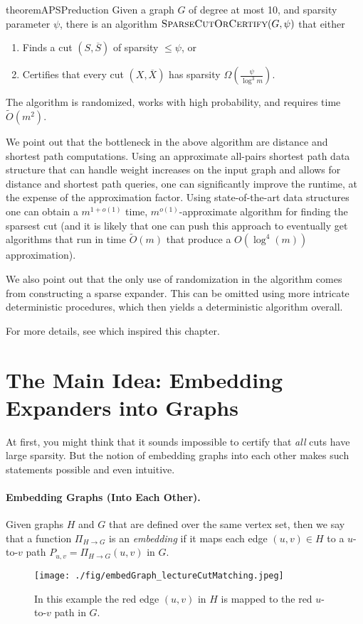 \begin{restatable}{theorem}{APSPreduction}\label{thm:fineGrainedReduction}
\label{theorem:balanceCut}
Given a graph $G$ of degree at most 10, and sparsity parameter $\psi$, there is an algorithm $\textsc{SparseCutOrCertify}(G, \psi)$ that either
\begin{enumerate}
    \item\label{case:balanceCut} Finds a cut $(S, \overline{S})$ of sparsity $\leq \psi$, or
    \item\label{case:noBalanceCut}
     Certifies that every cut $(X, \overline{X})$ has sparsity
  $\Omega\left(\frac{\psi}{ \log^3 m}\right).$
\end{enumerate}
The algorithm is randomized, works with high probability,  and requires time $\tilde{O}(m^2)$.
\end{restatable}

We point out that the bottleneck in the above algorithm are distance and shortest path computations. Using an approximate all-pairs shortest path data structure that can handle weight increases on the input graph and allows for distance and shortest path queries, one can significantly improve the runtime, at the expense of the approximation factor. Using state-of-the-art data structures \cite{chuzhoy2021decremental, bernstein2022deterministic} one can obtain a $m^{1+o(1)}$ time, $m^{o(1)}$-approximate algorithm for finding the sparsest cut (and it is likely that one can push this approach to eventually get algorithms that run in time $\tilde{O}(m)$ that produce a $O(\log^4(m))$ approximation).

We also point out that the only use of randomization in the algorithm comes from constructing a sparse expander. This can be omitted using more intricate deterministic procedures, which then yields a deterministic algorithm overall.

For more details, see \cite{chen2023simple} which inspired this chapter.

\section{The Main Idea: Embedding Expanders into Graphs}

At first, you might think that it sounds impossible to certify that \emph{all} cuts have large sparsity. But the notion of embedding graphs into each other makes such statements possible and even intuitive.

\paragraph{Embedding Graphs (Into Each Other).} Given graphs $H$ and $G$ that are defined over the same vertex set, then we say that a function $\Pi_{H \xrightarrow{} G}$ is an \emph{embedding} if it maps each edge $(u,v) \in H$ to a $u$-to-$v$ path $P_{u,v} = \Pi_{H \xrightarrow{} G}(u,v)$ in $G$. 
\begin{figure}[!ht]
    \centering
    \texttt{[image: ./fig/embedGraph\_lectureCutMatching.jpeg]}
    \caption{In this example the red edge $(u,v)$ in $H$ is mapped to the red $u$-to-$v$ path in $G$.}
    \label{fig:my_label}
\end{figure}

